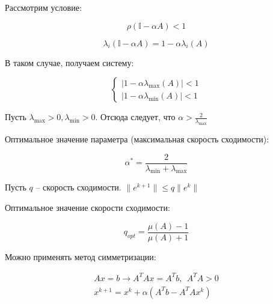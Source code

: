 \documentclass[10pt,a4paper]{article}
\begin{document}
		Рассмотрим условие:
		
		\begin{equation}
			\rho\left(\mathbb{I} - \alpha A\right) < 1
		\end{equation}
		
		\begin{equation}
			\lambda_{i}\left(\mathbb{I} - \alpha A\right) = 
			1 - \alpha\lambda_{i}\left(A\right)
		\end{equation}
		
		В таком случае, получаем систему:
		
		\begin{equation}
			\begin{cases}
				\left|1 - \alpha \lambda_{\max}\left(A\right)\right| < 1
				\\
				\left|1 - \alpha \lambda_{\min}\left(A\right)\right| < 1
			\end{cases}
		\end{equation}
		
		Пусть $\lambda_{\max} > 0, \lambda_{\min} > 0$. Отсюда следует, что $
		\alpha > \frac{2}{\lambda_{\max}}$
		
		Оптимальное значение параметра (максимальная скорость сходимости):
		
		\begin{equation}
			\alpha^{*} = \frac{2}{\lambda_{\min} + \lambda_{\max}}
		\end{equation}
		
		Пусть $q$ -- скорость сходимости. $\parallel e^{k + 1} \parallel 
		\leqslant q\parallel e^{k}\parallel$
		
		Оптимальное значение скорости сходимости:
		
		\begin{equation}
			q_{opt} = \frac{\mu\left(A\right) - 1}{\mu\left(A\right) + 1}
		\end{equation}
		
		Можно применять метод симметризации:
		
		\begin{eqnarray}
			Ax = b \rightarrow A^{T}Ax = A^{T}b, \ \ A^{T}A > 0\\
			x^{k + 1} = x^{k} + \alpha\left(A^{T}b - A^{T}Ax^{k}\right)
		\end{eqnarray}
\end{document}
